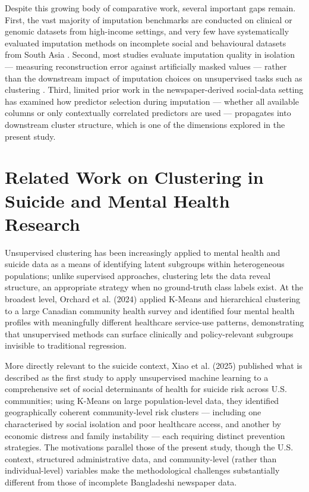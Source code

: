 Despite this growing body of comparative work, several important gaps remain. First, the vast majority of imputation benchmarks are conducted on clinical or genomic datasets from high-income settings, and very few have systematically evaluated imputation methods on incomplete social and behavioural datasets from South Asia \cite{ref8}. Second, most studies evaluate imputation quality in isolation --- measuring reconstruction error against artificially masked values --- rather than the downstream impact of imputation choices on unsupervised tasks such as clustering \cite{ref8,ref55}. Third, limited prior work in the newspaper-derived social-data setting has examined how predictor selection during imputation --- whether all available columns or only contextually correlated predictors are used --- propagates into downstream cluster structure, which is one of the dimensions explored in the present study.

\section{Related Work on Clustering in Suicide and Mental Health Research}

Unsupervised clustering has been increasingly applied to mental health and suicide data as a means of identifying latent subgroups within heterogeneous populations; unlike supervised approaches, clustering lets the data reveal structure, an appropriate strategy when no ground-truth class labels exist. At the broadest level, Orchard et al. (2024) \cite{ref34} applied K-Means and hierarchical clustering to a large Canadian community health survey and identified four mental health profiles with meaningfully different healthcare service-use patterns, demonstrating that unsupervised methods can surface clinically and policy-relevant subgroups invisible to traditional regression.

More directly relevant to the suicide context, Xiao et al. (2025) \cite{ref35} published what is described as the first study to apply unsupervised machine learning to a comprehensive set of social determinants of health for suicide risk across U.S. communities; using K-Means on large population-level data, they identified geographically coherent community-level risk clusters --- including one characterised by social isolation and poor healthcare access, and another by economic distress and family instability --- each requiring distinct prevention strategies. The motivations parallel those of the present study, though the U.S. context, structured administrative data, and community-level (rather than individual-level) variables make the methodological challenges substantially different from those of incomplete Bangladeshi newspaper data.

